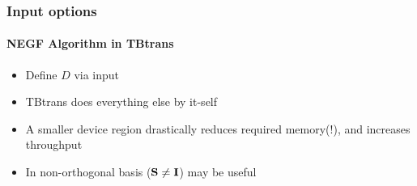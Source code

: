 \begin{frame}
  \frametitle{Input options}
  \framesubtitle{NEGF Algorithm in TBtrans}

  \begin{itemize}[<+->]
    \item Define $D$ via input
    
    
    \item TBtrans does everything else by it-self
    \item A smaller device region drastically reduces required memory(!), and increases
    throughput

    \item In non-orthogonal basis ($\mathbf{S}\neq \mathbf I$)  may
    be useful

  \end{itemize}



\end{frame}

